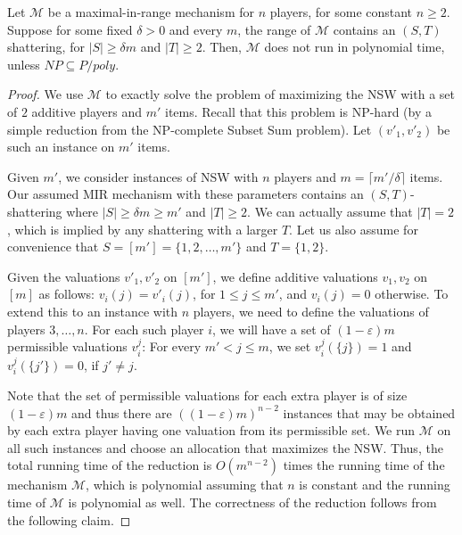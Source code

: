 \documentclass{theoretics}
\newcommand{\eps}{\varepsilon}
\newcommand{\cM}{{\mathcal M}}
\begin{document}
\begin{lemma}
Let $\cM$ be a maximal-in-range mechanism for $n$ players, for some constant $n \geq 2$. Suppose for some fixed $\delta>0$ and every $m$, the range of $\cM$ contains an $(S,T)$ shattering, for $|S| \geq \delta  m$ and $|T| \geq 2$. Then, $\cM$ does not run in polynomial time, unless $NP\subseteq P/poly$.
\end{lemma}

\begin{proof}
We use $\cM$ to exactly solve the problem of maximizing the NSW with a set of $2$ additive players and $m'$ items. Recall that this problem is NP-hard (by a simple reduction from the NP-complete Subset Sum problem). Let $(v'_1,v'_2)$ be such an instance on $m'$ items.

Given $m'$, we consider instances of NSW with $n$ players and $m = \lceil m' / \delta \rceil$ items. Our assumed MIR mechanism with these parameters contains an $(S,T)$-shattering where $|S| \geq \delta m \geq m'$ and $|T| \geq 2$. We can actually assume that $|T|=2$, which is implied by any shattering with a larger $T$. Let us also assume for convenience that $S = [m'] = \{1,2,\ldots, m'\}$ and $T = \{1,2\}$. 

Given the valuations $v'_1,v'_2$ on $[m']$, we define additive valuations $v_1,v_2$ on $[m]$ as follows: $v_i(j)=v'_i(j)$, for $1\leq j\leq m'$, and $v_i(j)=0$ otherwise. To extend this to an instance with $n$ players, we need to define the valuations of players $3,\ldots, n$. For each such player $i$, we will have a set of $(1-\eps) m$ permissible valuations $v^j_i$: For every $m' < j \leq m$, we set $v^j_i(\{j\})=1$ and $v^j_i(\{j'\})=0$, if $j'\neq j$.

Note that the set of permissible valuations for each extra player is of size $(1-\eps) m$ and thus there are $((1-\eps)m)^{n-2}$ instances that may be obtained by each extra player having one valuation from its permissible set. 
We run $\cM$ on all such instances and choose an allocation that maximizes the NSW. Thus, the total running time of the reduction is $O(m^{n-2})$ times the running time of the mechanism $\cM$, which is polynomial assuming that $n$ is constant and the running time of $\cM$ is polynomial as well. 
The correctness of the reduction follows from the following claim.






\end{proof}
\end{document}
